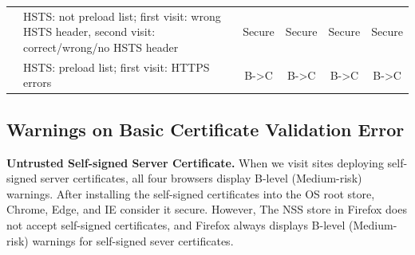 \begin{table}[htbp]
\begin{tabular}{p{2.5cm}|p{8cm}|cccc}
                                                                                                    & HSTS: not preload list; first visit: wrong HSTS header, second visit: correct/wrong/no HSTS header    & Secure               & Secure               & Secure               & Secure               \\
                                                                                                    & HSTS: preload list; first visit: HTTPS errors                                                       & B-\textgreater{}C    & B-\textgreater{}C    & B-\textgreater{}C    & B-\textgreater{}C    \\ \hline
\end{tabular}
  \vspace{6pt}



\end{table}%



\subsection{Warnings on Basic Certificate Validation Error}

\textbf{Untrusted Self-signed Server Certificate.}
    When we visit sites deploying self-signed server certificates, all four browsers display B-level (Medium-risk) warnings.
    After installing the self-signed certificates into the OS root store, Chrome, Edge, and IE consider it secure.
    However, The NSS store in Firefox does not accept self-signed certificates, and Firefox always displays B-level (Medium-risk) warnings for self-signed sever certificates.

